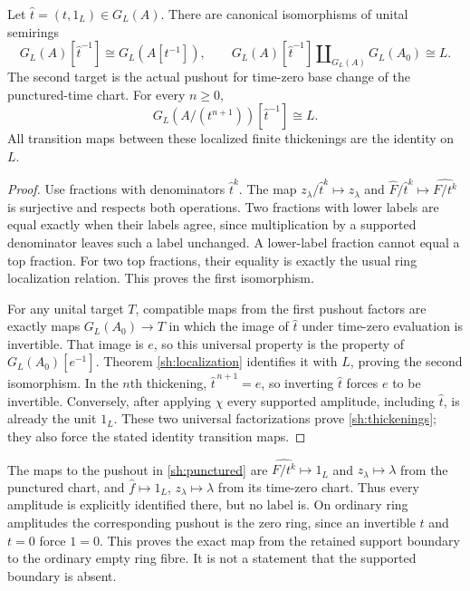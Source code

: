 \begin{theorem}
\label{sh:puncture}
Let $\widehat t=(t,1_L)\in G_L(A)$. There are canonical
isomorphisms of unital semirings
\begin{equation}\tag{SH28}\label{sh:punctured}
 G_L(A)[\widehat t^{-1}]\cong G_L(A[t^{-1}]),\qquad
 G_L(A)[\widehat t^{-1}]
       \amalg_{G_L(A)}G_L(A_0)\cong L.
\end{equation}
The second target is the actual pushout for time-zero base
change of the punctured-time chart. For every $n\ge0$,
\begin{equation}\tag{SH29}\label{sh:thickenings}
 G_L(A/(t^{n+1}))[\widehat t^{-1}]\cong L.
\end{equation}
All transition maps between these localized finite thickenings
are the identity on $L$.
\end{theorem}
\begin{proof}
Use fractions with denominators $\widehat t^k$. The map
$z_\lambda/\widehat t^k\mapsto z_\lambda$ and
$\widehat F/\widehat t^k\mapsto\widehat{F/t^k}$
is surjective and respects both operations. Two fractions with
lower labels are equal exactly when their labels agree, since
multiplication by a supported denominator leaves such a label
unchanged. A lower-label fraction cannot equal a top fraction.
For two top fractions, their equality is exactly the usual ring
localization relation. This proves the first isomorphism.

For any unital target $T$, compatible maps from the first
pushout factors are exactly maps $G_L(A_0)\to T$ in which
the image of $\widehat t$ under time-zero evaluation is
invertible. That image is $e$, so this universal property is
the property of $G_L(A_0)[e^{-1}]$. Theorem
\ref{sh:localization} identifies it with $L$, proving the second
isomorphism. In the $n$th thickening,
$\widehat t^{\,n+1}=e$, so inverting $\widehat t$ forces
$e$ to be invertible. Conversely, after applying $\chi$ every
supported amplitude, including $\widehat t$, is already the
unit $1_L$. These two universal factorizations prove
\eqref{sh:thickenings}; they also force the stated identity
transition maps.
\end{proof}

The maps to the pushout in \eqref{sh:punctured} are
$\widehat{F/t^k}\mapsto1_L$ and
$z_\lambda\mapsto\lambda$ from the punctured chart, and
$\widehat f\mapsto1_L$, $z_\lambda\mapsto\lambda$ from its
time-zero chart. Thus every amplitude is explicitly identified
there, but no label is. On ordinary ring amplitudes the
corresponding pushout is the zero ring, since an invertible
$t$ and $t=0$ force $1=0$. This proves the exact map from
the retained support boundary to the ordinary empty ring fibre.
It is not a statement that the supported boundary is absent.

